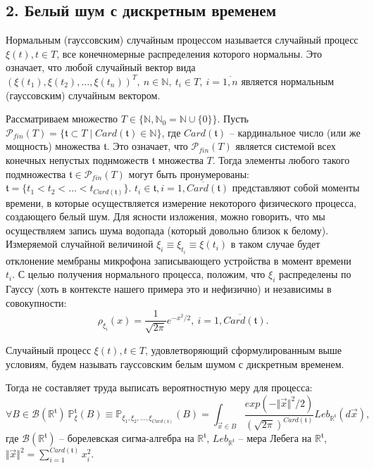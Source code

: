 \subsection*{2. Белый шум с дискретным временем}

\begin{definition} Нормальным (гауссовским) случайным процессом называется случайный процесс $\xi(t), t \in T$,
все конечномерные распределения которого нормальны. Это означает, что любой случайный вектор вида
$(\xi(t_1), \xi(t_2), \dots, \xi(t_n))^T ,~ n \in \mathbb{N} ,~ t_i \in T ,~ i = \overline{1, n}$
является нормальным (гауссовским) случайным вектором. \cite{NatanTeorVero2007} \\
\end{definition}

Рассматриваем множество $T \in \{ \mathbb{N}, \mathbb{N}_0 = \mathbb{N} \cup \{0\} \}$.
Пусть $\mathscr{P}_{fin}(T) =  \{ \mathfrak{t} \subset T \mid Card(\mathfrak{t}) \in \mathbb{N} \}$,
где $Card(\mathfrak{t})$ -- кардинальное число (или же мощность) множества $\mathfrak{t}$.
Это означает, что $\mathscr{P}_{fin}(T)$ является системой
всех конечных непустых поднможеств $\mathfrak{t}$ множества $T$.
Тогда элементы любого такого подмножества $\mathfrak{t} \in \mathscr{P}_{fin}(T)$ могут быть пронумерованы:
$\mathfrak{t} = \{ t_1 < t_2 < \dots < t_{Card(\mathfrak{t})} \}$.
$t_i \in \mathfrak{t}, i = \overline{1, Card(\mathfrak{t})}$ представляют собой моменты времени,
в которые осуществляется измерение некоторого физического процесса, создающего белый шум.
Для ясности изложения, можно говорить, что мы осуществляем запись шума водопада (который довольно близок к белому).
Измеряемой случайной величиной $\xi_i \equiv \xi_{t_i} \equiv \xi(t_i)$ в таком случае будет
отклонение мембраны микрофона записывающего устройства в момент времени $t_i$.
С целью получения нормального процесса, положим, что $\xi_i$ распределены по Гауссу
(хоть в контексте нашего примера это и нефизично) и независимы в совокупности:
$$ \rho_{\xi_i}(x) = \frac{1}{\sqrt{2\pi}} e^{-x^2/2} ,~ i = \overline{1, Card(\mathfrak{t})} .$$

\begin{definition} Случайный процесс $\xi(t), t \in T$,
удовлетворяющий сформулированным выше условиям, будем называть гауссовским белым шумом с дискретным временем. \cite{ShamarovDRP} \\
\end{definition}

\noindent Тогда не составляет труда выписать вероятностную меру для процесса:
$$\forall B \in \mathscr{B}(\mathbb{R}^{\mathfrak{t}}) ~ \mathbb{P}_{\xi}^{\mathfrak{t}}(B) \equiv 
\mathbb{P}_{\xi_1, \xi_2, \dots, \xi_{Card(\mathfrak{t})}}(B) = 
\int_{\vec{x} \in B} \frac {exp(-\Vert \vec{x} \Vert ^2 / 2)} {(\sqrt{2\pi}) ^ {Card(\mathfrak{t})}}
Leb_{\mathbb{R}^{\mathfrak{t}}}(d\vec{x}) ,$$ 
где $\mathscr{B}(\mathbb{R}^{\mathfrak{t}})$ -- борелевская сигма-алгебра на $\mathbb{R}^{\mathfrak{t}}$, 
$Leb_{\mathbb{R}^{\mathfrak{t}}}$ -- мера Лебега на $\mathbb{R}^{\mathfrak{t}}$,
$\Vert \vec{x} \Vert ^2 = \sum_{i = 1}^{Card(\mathfrak{t})} x_i^2$. \\

